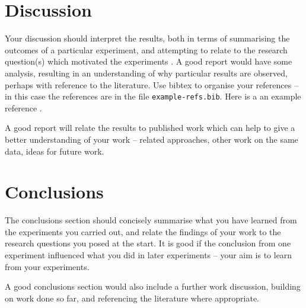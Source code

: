 \documentclass{article}
\begin{document}
\section{Discussion}
Your discussion should interpret the results, both in terms of summarising the outcomes of a particular experiment, and attempting to relate to the research question(s) which motivated the experiments . A good report would have some analysis, resulting in an understanding of why particular results are observed, perhaps with reference to the literature. Use bibtex to organise your references -- in this case the references are in the file \verb+example-refs.bib+.  Here is a an example reference \citep{langley00}.  

A good report will relate the results to  published work which can help to give a better understanding of your work -- related approaches, other work on the same data, ideas for future work. 





\section{Conclusions}
\label{sec:concl}
The conclusions section should concisely summarise what you have learned from the experiments you carried out, and relate the findings of your work to the  research questions you posed at the start.   It is good if the conclusion from one experiment influenced what you did in later experiments -- your aim is to learn from your experiments.   

A good conclusions section would also include a further work discussion, building on work done so far, and referencing the literature where appropriate.


\end{document}
